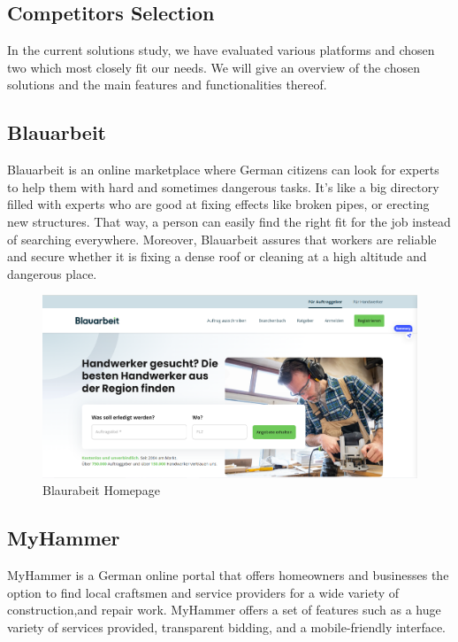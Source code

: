 \subsection{Competitors Selection}
In the current solutions study, we have evaluated various platforms and chosen two which most closely fit our needs. We will give an overview of the chosen solutions and the main features and functionalities thereof.

\subsection{Blauarbeit}
Blauarbeit is an online marketplace where German citizens can look for experts to help them with hard and sometimes dangerous tasks.
It's like a big directory filled with experts who are good at fixing effects like broken pipes, or erecting new structures.
That way, a person can easily find the right fit for the job instead of searching everywhere. Moreover, Blauarbeit assures that workers are reliable and secure whether it is fixing a dense roof or cleaning at a high altitude and dangerous place.


\begin{figure}[H]
    \centering
    \includegraphics[width=\linewidth]{src/assets/chapters/Blaurabeit.PNG}
    \caption{Blaurabeit Homepage}
    \label{fig:blaurabeit_image}
\end{figure}


\subsection{MyHammer}
MyHammer is a German online portal that offers homeowners and businesses the option to find local craftsmen and service providers for a wide variety of construction,and repair work.
MyHammer offers a set of features such as a huge variety of services provided, transparent bidding, and a mobile-friendly interface.


